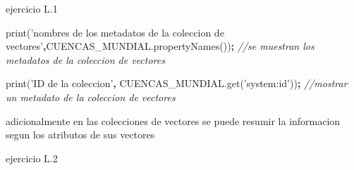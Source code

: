 \documentclass[
]{article}
\newenvironment{Shaded}{\begin{snugshade}}{\end{snugshade}}
\newcommand{\AttributeTok}[1]{\textcolor[rgb]{0.77,0.63,0.00}{#1}}
\newcommand{\CommentTok}[1]{\textcolor[rgb]{0.56,0.35,0.01}{\textit{#1}}}
\newcommand{\NormalTok}[1]{#1}
\newcommand{\OperatorTok}[1]{\textcolor[rgb]{0.81,0.36,0.00}{\textbf{#1}}}
\newcommand{\StringTok}[1]{\textcolor[rgb]{0.31,0.60,0.02}{#1}}
\newcommand{\VariableTok}[1]{\textcolor[rgb]{0.00,0.00,0.00}{#1}}
\begin{document}
ejercicio L.1

\begin{Shaded}
\begin{Highlighting}[]
\AttributeTok{print}\NormalTok{(}\StringTok{'nombres de los metadatos de la coleccion de vectores'}\OperatorTok{,}\VariableTok{CUENCAS_MUNDIAL}\NormalTok{.}\AttributeTok{propertyNames}\NormalTok{())}\OperatorTok{;} \CommentTok{//se muestran los metadatos de la coleccion de vectores}

\AttributeTok{print}\NormalTok{(}\StringTok{'ID de la coleccion'}\OperatorTok{,} \VariableTok{CUENCAS_MUNDIAL}\NormalTok{.}\AttributeTok{get}\NormalTok{(}\StringTok{'system:id'}\NormalTok{))}\OperatorTok{;} \CommentTok{//mostrar un metadato de la coleccion de vectores}
\end{Highlighting}
\end{Shaded}

adicionalmente en las colecciones de vectores se puede resumir la
informacion segun los atributos de sus vectores

ejercicio L.2
\end{document}
